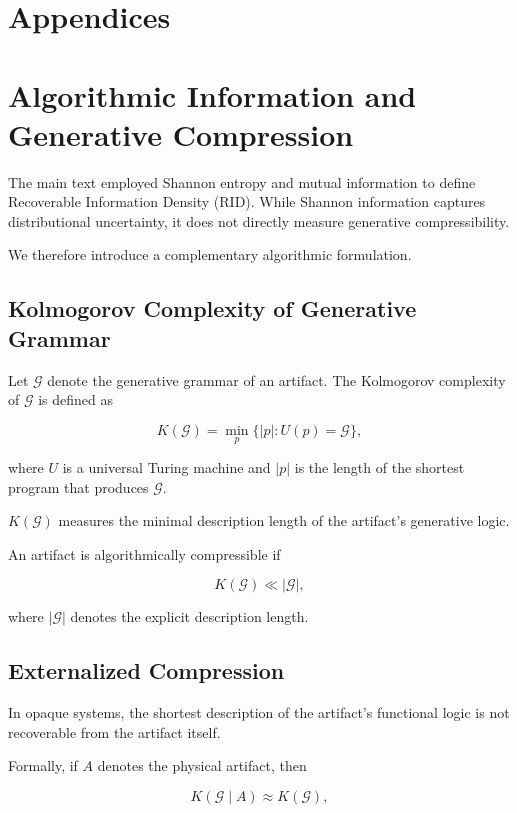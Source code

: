 \documentclass[11pt]{article}
\begin{document}
\newpage
\section*{Appendices}

\appendix

\section{Algorithmic Information and Generative Compression}

The main text employed Shannon entropy and mutual information
to define Recoverable Information Density (RID). While Shannon
information captures distributional uncertainty, it does not
directly measure generative compressibility.

We therefore introduce a complementary algorithmic formulation.

\subsection{Kolmogorov Complexity of Generative Grammar}

Let $\mathcal{G}$ denote the generative grammar of an artifact.
The Kolmogorov complexity of $\mathcal{G}$ is defined as

\[
K(\mathcal{G}) = \min_{p} \{ |p| : U(p) = \mathcal{G} \},
\]

where $U$ is a universal Turing machine and $|p|$ is the length
of the shortest program that produces $\mathcal{G}$.

$K(\mathcal{G})$ measures the minimal description length of the
artifact's generative logic.

An artifact is algorithmically compressible if

\[
K(\mathcal{G}) \ll |\mathcal{G}|,
\]

where $|\mathcal{G}|$ denotes the explicit description length.

\subsection{Externalized Compression}

In opaque systems, the shortest description of the artifact's
functional logic is not recoverable from the artifact itself.

Formally, if $A$ denotes the physical artifact, then

\[
K(\mathcal{G} \mid A) \approx K(\mathcal{G}),
\]
\end{document}
